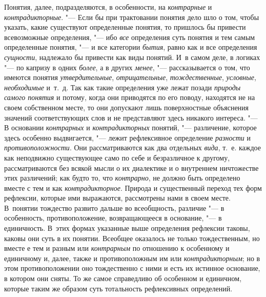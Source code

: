 {Понятия, далее, подразделяются, в особенности, на
{\em контрарные} и
{\em контрадикторные}. "---
Если бы при трактовании понятия дело шло о том, чтобы
указать, какие существуют определенные понятия, то пришлось бы привести
всевозможные определения, "--- ибо
{\em все} определения
суть понятия и тем самым определенные понятия, "--- и все
категории {\em бытия},
равно как и все определения
{\em сущности}, надлежало
бы привести как виды понятий. И~в самом деле, в логиках "--- по
капризу в одних {\em более},
а в других {\em менее}, "---
рассказывается о том, что имеются понятия
{\em утвердительные},
{\em отрицательные},
{\em тождественные},
{\em условные},
{\em необходимые} и~т.~д.
Так как такие определения уже лежат позади
{\em природы самого понятия}
и потому, когда они приводятся по его поводу, находятся не на
своем собственном месте, то они допускают лишь поверхностные объяснения
значений соответствующих слов и не представляют здесь никакого интереса. "---
В основании
{\em контрарных} и
{\em контрадикторных}
понятий, "--- различение, которое здесь особенно
выдвигается, "--- лежит рефлексивное определение
{\em разности} и
{\em противоположности}.
Они рассматриваются как два отдельных
{\em вида}, т.~е. каждое
как неподвижно существующее само по себе и безразличное к другому,
рассматриваются без всякой мысли о их диалектике и о внутреннем ничтожестве
этих различений; как будто то, что
{\em контрарно}, не
должно быть определено вместе с тем и как
{\em контрадикторное}.
Природа и существенный переход тех форм рефлексии, которые
ими выражаются, рассмотрены нами в своем месте. В~понятии тождество развито
дальше во всеобщность, различие "--- в особенность,
противоположение, возвращающееся в основание, "--- в
единичность. В~этих формах указанные выше определения рефлексии таковы,
каковы они суть в их понятии. Всеобщее оказалось не только тождественным,
но вместе е тем и разным или
{\em контрарным} по
отношению к особенному и единичному и, далее, также и противоположным им
или {\em контрадикторным};
но в этом противоположении оно тождественно с ними и есть их
истинное основание, в котором они сняты. То же самое справедливо об
особенном и единичном, которые таким же образом суть тотальность
рефлексивных определений.

}
